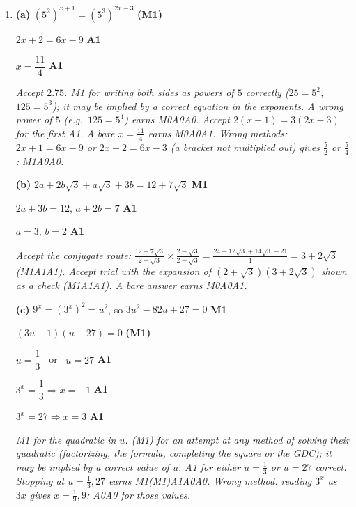 \documentclass[12pt, twoside]{article}
\begin{document}
\begin{enumerate}[itemsep=0.3cm]
\newpage

\item[3.] [Maximum mark: 11]

\textbf{(a)} $\left(5^{2}\right)^{x + 1} = \left(5^{3}\right)^{2x - 3}$ \hfill \textbf{(M1)}

$2x + 2 = 6x - 9$ \hfill \textbf{A1}

$x = \dfrac{11}{4}$ \hfill \textbf{A1}

\emph{Accept $2.75$. M1 for writing both sides as powers of $5$ correctly
($25 = 5^{2}$, $125 = 5^{3}$); it may be implied by a correct equation in the
exponents. A wrong power of $5$ (e.g.\ $125 = 5^{4}$) earns M0A0A0. Accept
$2(x + 1) = 3(2x - 3)$ for the first A1. A bare $x = \frac{11}{4}$ earns
M0A0A1. Wrong
methods: $2x + 1 = 6x - 9$ or $2x + 2 = 6x - 3$ (a bracket not multiplied
out) gives $\frac{5}{2}$ or $\frac{5}{4}$: M1A0A0.}

\textbf{(b)} $2a + 2b\sqrt{3} + a\sqrt{3} + 3b = 12 + 7\sqrt{3}$ \hfill \textbf{M1}

$2a + 3b = 12$, \quad $a + 2b = 7$ \hfill \textbf{A1}

$a = 3$, \quad $b = 2$ \hfill \textbf{A1}

\emph{Accept the conjugate route:
$\frac{12 + 7\sqrt{3}}{2 + \sqrt{3}} \times \frac{2 - \sqrt{3}}{2 - \sqrt{3}}
= \frac{24 - 12\sqrt{3} + 14\sqrt{3} - 21}{1} = 3 + 2\sqrt{3}$ (M1A1A1).
Accept trial with the expansion of $(2 + \sqrt{3})(3 + 2\sqrt{3})$ shown as
a check (M1A1A1). A bare answer earns M0A0A1.}

\textbf{(c)} $9^{x} = \left(3^{x}\right)^{2} = u^{2}$, so $3u^{2} - 82u + 27 = 0$ \hfill \textbf{M1}

$(3u - 1)(u - 27) = 0$ \hfill \textbf{(M1)}

$u = \dfrac{1}{3}$ \ or \ $u = 27$ \hfill \textbf{A1}

$3^{x} = \dfrac{1}{3} \Rightarrow x = -1$ \hfill \textbf{A1}

$3^{x} = 27 \Rightarrow x = 3$ \hfill \textbf{A1}

\emph{M1 for the quadratic in $u$. (M1) for an attempt at any method of
solving their quadratic (factorizing, the formula, completing the square or
the GDC); it may be implied by a correct value of $u$. A1 for either
$u = \frac{1}{3}$ or $u = 27$ correct. Stopping at $u = \frac{1}{3}, 27$
earns M1(M1)A1A0A0. Wrong method: reading $3^{x}$ as $3x$ gives
$x = \frac{1}{9}, 9$: A0A0 for those values.}


\end{enumerate}
\end{document}
